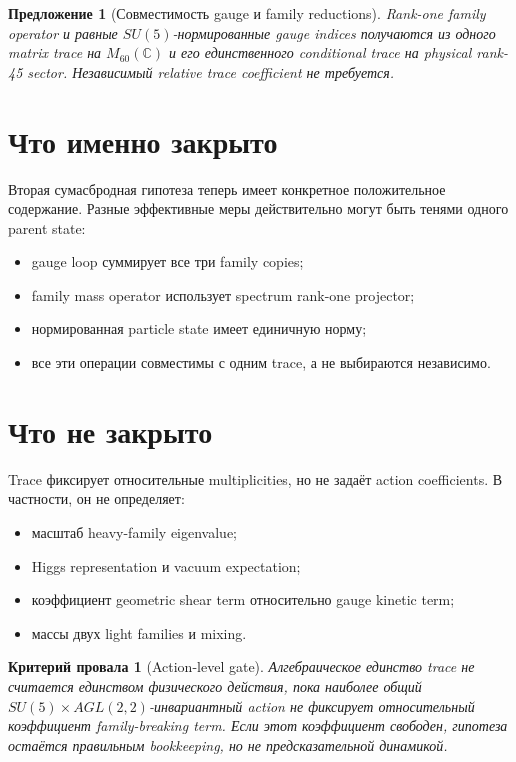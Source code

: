 \documentclass[12pt,a4paper]{article}
\newtheorem{proposition}{Предложение}
\newtheorem{nogocriterion}{Критерий провала}
\begin{document}
\begin{proposition}[Совместимость gauge и family reductions]
Rank-one family operator и равные \(SU(5)\)-нормированные gauge indices получаются из одного matrix trace на \(M_{60}(\mathbb C)\) и его единственного conditional trace на physical rank-45 sector. Независимый relative trace coefficient не требуется.
\end{proposition}

\section{Что именно закрыто}

Вторая сумасбродная гипотеза теперь имеет конкретное положительное содержание. Разные эффективные меры действительно могут быть тенями одного parent state:
\begin{itemize}
    \item gauge loop суммирует все три family copies;
    \item family mass operator использует spectrum rank-one projector;
    \item нормированная particle state имеет единичную норму;
    \item все эти операции совместимы с одним trace, а не выбираются независимо.
\end{itemize}

\section{Что не закрыто}

Trace фиксирует относительные multiplicities, но не задаёт action coefficients. В частности, он не определяет:
\begin{itemize}
    \item масштаб heavy-family eigenvalue;
    \item Higgs representation и vacuum expectation;
    \item коэффициент geometric shear term относительно gauge kinetic term;
    \item массы двух light families и mixing.
\end{itemize}

\begin{nogocriterion}[Action-level gate]
Алгебраическое единство trace не считается единством физического действия, пока наиболее общий \(SU(5)\times AGL(2,2)\)-инвариантный action не фиксирует относительный коэффициент family-breaking term. Если этот коэффициент свободен, гипотеза остаётся правильным bookkeeping, но не предсказательной динамикой.
\end{nogocriterion}
\end{document}
